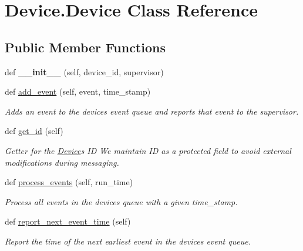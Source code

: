 \hypertarget{class_device_1_1_device}{}\section{Device.\+Device Class Reference}
\label{class_device_1_1_device}
\subsection*{Public Member Functions}
\begin{DoxyCompactItemize}
\item 
\mbox{\label{class_device_1_1_device_a9466bb46f9466112557bd694db6ee0b9}} 
def {\bfseries \+\_\+\+\_\+init\+\_\+\+\_\+} (self, device\+\_\+id, supervisor)
\item 
def \hyperlink{class_device_1_1_device_a48c0cd986e11f67d2373871ade40992e}{add\+\_\+event} (self, event, time\+\_\+stamp)
\begin{DoxyCompactList}\small\item\em Adds an event to the device\textquotesingle{}s event queue and reports that event to the supervisor. \end{DoxyCompactList}\item 
def \hyperlink{class_device_1_1_device_a3aef2a6e416795690e9b697b3fcf4d76}{get\+\_\+id} (self)
\begin{DoxyCompactList}\small\item\em Getter for the \hyperlink{class_device_1_1_device}{Device}\textquotesingle{}s ID We maintain ID as a protected field to avoid external modifications during messaging. \end{DoxyCompactList}\item 
def \hyperlink{class_device_1_1_device_afd1b29eb311904ffa8565fd2d2079967}{process\+\_\+events} (self, run\+\_\+time)
\begin{DoxyCompactList}\small\item\em Process all events in the device\textquotesingle{}s queue with a given time\+\_\+stamp. \end{DoxyCompactList}\item 
def \hyperlink{class_device_1_1_device_abb9e113d3aba9118bbd205198e656b7a}{report\+\_\+next\+\_\+event\+\_\+time} (self)
\begin{DoxyCompactList}\small\item\em Report the time of the next earliest event in the device\textquotesingle{}s event queue. \end{DoxyCompactList}\item 

\end{DoxyCompactItemize}
